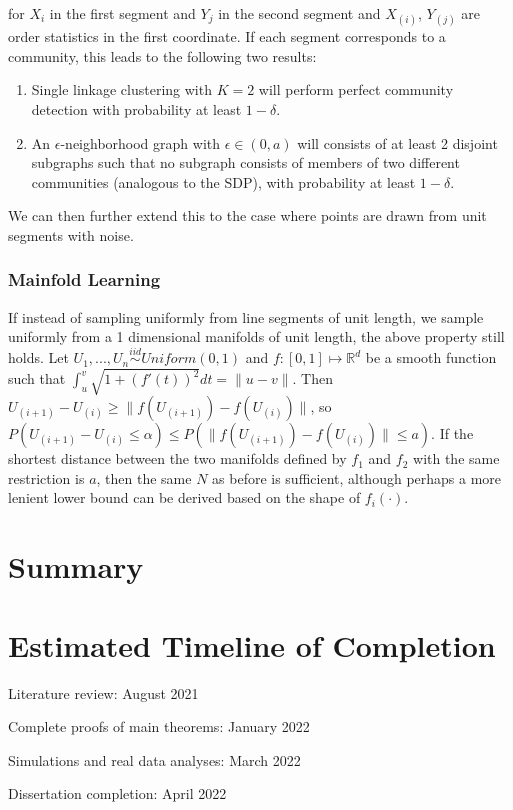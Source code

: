 \documentclass[
  11pt,
]{article}
\begin{document}
for \(X_i\) in the first segment and \(Y_j\) in the second segment and
\(X_{(i)}\), \(Y_{(j)}\) are order statistics in the first coordinate.
If each segment corresponds to a community, this leads to the following
two results:

\begin{enumerate}
\def\labelenumi{\arabic{enumi}.}
\item
  Single linkage clustering with \(K = 2\) will perform perfect
  community detection with probability at least \(1 - \delta\).
\item
  An \(\epsilon\)-neighborhood graph with \(\epsilon \in (0, a)\) will
  consists of at least 2 disjoint subgraphs such that no subgraph
  consists of members of two different communities (analogous to the
  SDP), with probability at least \(1 - \delta\).
\end{enumerate}

We can then further extend this to the case where points are drawn from
unit segments with noise.

\hypertarget{mainfold-learning}{%
\subsubsection{Mainfold Learning}\label{mainfold-learning}}

If instead of sampling uniformly from line segments of unit length, we
sample uniformly from a 1 dimensional manifolds of unit length, the
above property still holds. Let
\(U_1, ..., U_n \stackrel{iid}{\sim} Uniform(0, 1)\) and
\(f : [0, 1] \mapsto \mathbb{R}^d\) be a smooth function such that
\(\int_u^v \sqrt{1 + (f'(t))^2} dt = \|u - v\|\). Then
\(U_{(i+1)} - U_{(i)} \geq \|f(U_{(i+1)}) - f(U_{(i)})\|\), so
\(P(U_{(i+1)} - U_{(i)} \leq \alpha) \leq P(\|f(U_{(i+1)}) - f(U_{(i)})\| \leq a)\).
If the shortest distance between the two manifolds defined by \(f_1\)
and \(f_2\) with the same restriction is \(a\), then the same \(N\) as
before is sufficient, although perhaps a more lenient lower bound can be
derived based on the shape of \(f_i(\cdot)\).

\hypertarget{summary}{%
\section{Summary}\label{summary}}

\hypertarget{estimated-timeline-of-completion}{%
\section{Estimated Timeline of
Completion}\label{estimated-timeline-of-completion}}

Literature review: August 2021

Complete proofs of main theorems: January 2022

Simulations and real data analyses: March 2022

Dissertation completion: April 2022

\newpage

\renewcommand\refname{References}
  
\end{document}
